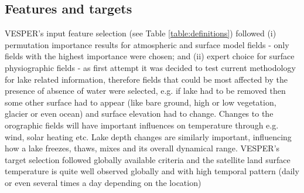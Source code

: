 \documentclass[hess, twostagejnl]{copernicus}
\begin{document}
\subsection{Features and targets}
VESPER's input feature selection (see Table \ref{table:definitions}) followed (i) permutation importance results for atmospheric and surface model fields - only fields with the highest importance were chosen; and (ii) expert choice for surface physiographic fields - as first attempt it was decided to test current methodology for lake related information, therefore fields that could be most affected by the presence of absence of water were selected, e.g. if lake had to be removed then some other surface had to appear (like bare ground, high or low vegetation, glacier or even ocean) and surface elevation had to change. Changes to the orographic fields will have important influences on temperature through e.g. wind, solar heating etc. Lake depth changes are similarly important, influencing how a lake freezes, thaws, mixes and its overall dynamical range. VESPER's target selection followed globally available criteria and the satellite land surface temperature is quite well observed globally and with high temporal pattern (daily or even several times a day depending on the location)
\end{document}
